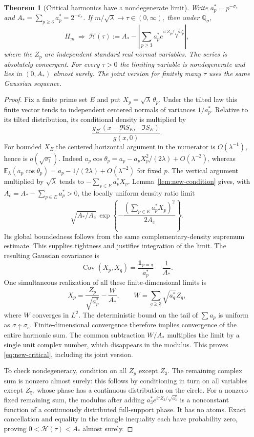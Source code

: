 \documentclass[11pt,a4paper]{article}
\newtheorem{theorem}{Theorem}[section]
\theoremstyle{definition}
\theoremstyle{remark}\newtheorem{remark}[theorem]{Remark}
\begin{document}
\begin{theorem}[Critical harmonics have a nondegenerate limit]
\label{thm:new-critical}
Write $a_p^*=p^{-\sigma_e}$ and $A_*=\sum_{p\geq3}a_p^*=2^{-\sigma_e}$.
If $m/\sqrt\lambda\to\tau\in(0,\infty)$, then under
$\mathbb Q_\sigma$,
\begin{equation}\label{eq:new-critical}
 H_m\ \Longrightarrow\
 \mathcal H(\tau):=
 A_*-\left|\sum_{p\geq3}a_p^*
                   e^{i\tau Z_p/\sqrt{a_p^*}}\right|,
\end{equation}
where the $Z_p$ are independent standard real normal variables.
The series is absolutely convergent.  For every $\tau>0$ the limiting
variable is nondegenerate and lies in $(0,A_*)$ almost surely.  The joint
version for finitely many $\tau$ uses the same Gaussian sequence.
\end{theorem}

\begin{proof}
Fix a finite prime set $E$ and put $X_p=\sqrt\lambda\,\theta_p$.
Under the tilted law this finite vector tends to independent centered
normals of variances $1/a_p^*$.  Relative to its tilted distribution, its
conditional density is multiplied by
\[
 \frac{g_{E^c}(x-\Re S_E,-\Im S_E)}{g(x,0)}.
\]
For bounded $X_E$ the centered horizontal argument in the numerator is
$O(\lambda^{-1})$, hence is $o(\sqrt{v_1})$.  Indeed
$a_p\cos\theta_p=a_p-a_pX_p^2/(2\lambda)+O(\lambda^{-2})$, whereas
$\mathbb E_\lambda(a_p\cos\theta_p)
=a_p-1/(2\lambda)+O(\lambda^{-2})$ for fixed $p$.
The vertical argument multiplied by $\sqrt\lambda$ tends to
$-\sum_{p\in E}a_p^*X_p$.  Lemma~\ref{lem:new-condition} gives, with
$A_c=A_*-\sum_{p\in E}a_p^*>0$, the locally uniform density ratio limit
\[
 \sqrt{A_*/A_c}\,
 \exp\left\{-\frac{(\sum_{p\in E}a_p^*X_p)^2}{2A_c}\right\}.
\]
Its global boundedness follows from the same complementary-density
supremum estimate.  This supplies tightness and justifies integration of
the limit.  The resulting Gaussian covariance is
\[
 \operatorname{Cov}(X_p,X_q)=\frac{\mathbf1_{p=q}}{a_p^*}-\frac1{A_*}.
\]
One simultaneous realization of all these finite-dimensional limits is
\[
 X_p=\frac{Z_p}{\sqrt{a_p^*}}-\frac W{A_*},\qquad
 W=\sum_{q\geq3}\sqrt{a_q^*}Z_q,
\]
where $W$ converges in $L^2$.  The deterministic bound on the tail of
$\sum a_p$ is uniform as $\sigma\uparrow\sigma_e$.  Finite-dimensional
convergence therefore implies convergence of the entire harmonic sum.
The common subtraction $W/A_*$ multiplies the limit by a single unit
complex number, which disappears in the modulus.  This proves
\eqref{eq:new-critical}, including its joint version.

To check nondegeneracy, condition on all $Z_p$ except $Z_3$.
The remaining complex sum is nonzero almost surely: this follows by
conditioning in turn on all variables except $Z_5$, whose phase has a
continuous distribution on the circle.  For a nonzero fixed remaining
sum, the modulus after adding $a_3^*e^{i\tau Z_3/\sqrt{a_3^*}}$ is a
nonconstant function of a continuously distributed full-support phase.
It has no atoms.  Exact cancellation and equality in the triangle
inequality each have probability zero, proving $0<\mathcal H(\tau)<A_*$
almost surely.
\end{proof}
\end{document}
